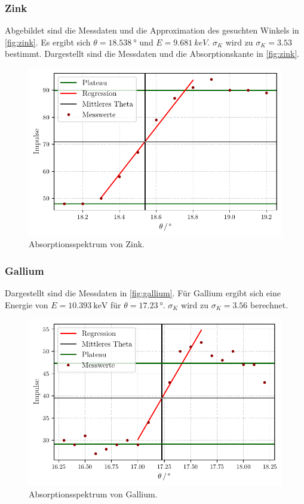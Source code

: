 \subsubsection{Zink}
Abgebildet sind die Messdaten und die Approximation des gesuchten Winkels in \autoref{fig:zink}.
Es ergibt sich $\theta = \qty{18.538}{°}$ und $E = \qty{9.681}{keV}$.
$\sigma_K$ wird zu $\sigma_K = 3.53$ bestimmt.
Dargestellt sind die Messdaten und die Absorptionskante in \autoref{fig:zink}.
\begin{figure}[H]
  \centering
  \includegraphics[width=0.5 \linewidth]{build/zink.pdf}
  \caption{Absorptionsspektrum von Zink.}
  \label{fig:zink}
\end{figure}

\subsubsection{Gallium}
Dargestellt sind die Messdaten in \autoref{fig:gallium}.
Für Gallium ergibt sich eine Energie von $E = \qty{10.393}{\keV}$ für $\theta = \qty{17.23}{°}$.
$\sigma_K$ wird zu $\sigma_K = 3.56$ berechnet.
\begin{figure}[H]
  \centering
  \includegraphics[width=0.5 \linewidth]{build/gallium.pdf}
  \caption{Absorptionsspektrum von Gallium.}
  \label{fig:gallium}
\end{figure}

